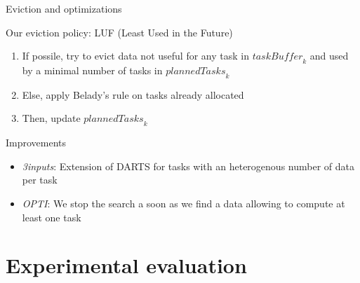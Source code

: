 \documentclass{libs/ufc_format}
\newcommand{\threeinputs}{\textit{3inputs}\xspace}
\newcommand{\OPTI}{\textit{OPTI}\xspace}
\newcommand{\GPU}[1]{\ensuremath{\mathrm{GPU}_{#1}}\xspace}
\newcommand{\plannedTasks}[1]{\ensuremath{\mathit{plannedTasks}_{#1}}\xspace}
\newcommand{\pulledTasks}[1]{\ensuremath{\mathit{taskBuffer}_{#1}}\xspace}
\newcommand{\nologo}{\setbeamertemplate{logo}{}} %
\begin{document}
\begin{frame}{Eviction and optimizations}
	\begin{alertblock}{Our eviction policy: LUF (Least Used in the Future)}
		\begin{enumerate}
			\item If possile, try to evict data not useful for any task in \pulledTasks{k} and used by a minimal number of tasks in $\plannedTasks{k}$
			\item Else, apply Belady's rule on tasks already allocated
			\item Then, update $\plannedTasks{k}$
		\end{enumerate}
	\end{alertblock}
	\begin{alertblock}{Improvements}
		\begin{itemize}
			\item \threeinputs: Extension of DARTS for tasks with an heterogenous number of data per task
			\item \OPTI: We stop the search a soon as we find a data allowing to compute at least one task
		\end{itemize}
	\end{alertblock}
\end{frame}

\section{Experimental evaluation}
\end{document}
